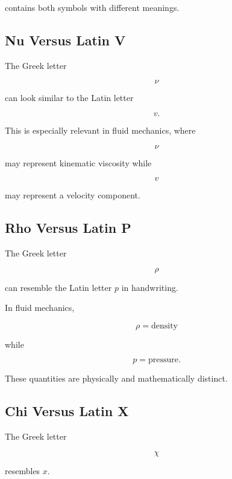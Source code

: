 contains both symbols with different meanings.

\subsection{Nu Versus Latin V}
\label{subsec:nu-versus-v}

The Greek letter

\[
\boxed{
\nu
}
\]

can look similar to the Latin letter

\[
\boxed{
v.
}
\]

This is especially relevant in fluid mechanics, where

\[
\nu
\]

may represent kinematic viscosity while

\[
v
\]

may represent a velocity component.

\subsection{Rho Versus Latin P}
\label{subsec:rho-versus-p}

The Greek letter

\[
\boxed{
\rho
}
\]

can resemble the Latin letter \(p\) in handwriting.

In fluid mechanics,

\[
\boxed{
\rho
=
\text{density}
}
\]

while

\[
\boxed{
p
=
\text{pressure}.
}
\]

These quantities are physically and mathematically distinct.

\subsection{Chi Versus Latin X}
\label{subsec:chi-versus-x}

The Greek letter

\[
\boxed{
\chi
}
\]

resembles \(x\).

